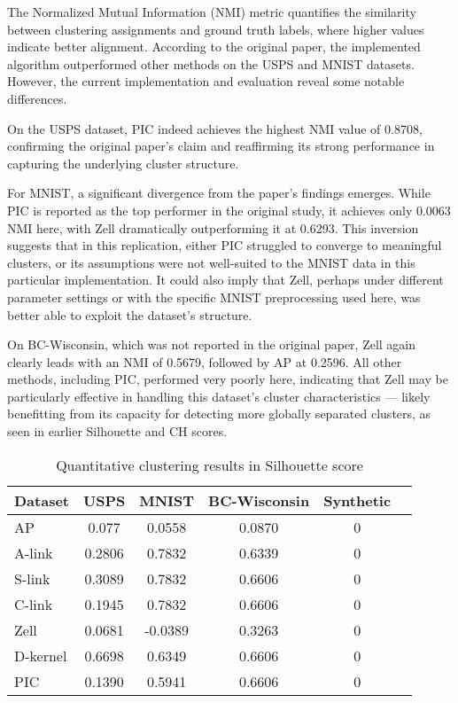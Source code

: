 \documentclass[
	10pt,
	parskip=half-,	
	paper=a4,
	english
	]{scrartcl}
\begin{document}
The Normalized Mutual Information (NMI) metric quantifies the similarity between clustering assignments and ground truth labels, where higher values indicate better alignment. According to the original paper, the implemented algorithm outperformed other methods on the USPS and MNIST datasets. However, the current implementation and evaluation reveal some notable differences.

On the USPS dataset, PIC indeed achieves the highest NMI value of 0.8708, confirming the original paper's claim and reaffirming its strong performance in capturing the underlying cluster structure. 

For MNIST, a significant divergence from the paper's findings emerges. While PIC is reported as the top performer in the original study, it achieves only 0.0063 NMI here, with Zell dramatically outperforming it at 0.6293. This inversion suggests that in this replication, either PIC struggled to converge to meaningful clusters, or its assumptions were not well-suited to the MNIST data in this particular implementation. It could also imply that Zell, perhaps under different parameter settings or with the specific MNIST preprocessing used here, was better able to exploit the dataset's structure.

On BC-Wisconsin, which was not reported in the original paper, Zell again clearly leads with an NMI of 0.5679, followed by AP at 0.2596. All other methods, including PIC, performed very poorly here, indicating that Zell may be particularly effective in handling this dataset's cluster characteristics — likely benefitting from its capacity for detecting more globally separated clusters, as seen in earlier Silhouette and CH scores.

\begin{table}[h]
    \centering
    \caption{Quantitative clustering results in Silhouette score}
    \begin{tabular}{lccccc}
    \toprule
    \textbf{Dataset} & \textbf{USPS} & \textbf{MNIST} & \textbf{BC-Wisconsin} & \textbf{Synthetic}\\
    \midrule
    AP       & 0.077   & 0.0558 & 0.0870  & 0 \\
    A-link   & 0.2806  & 0.7832 & 0.6339  & 0   \\
    S-link   & 0.3089   & 0.7832 & 0.6606  & 0 \\
    C-link   & 0.1945   & 0.7832 & 0.6606  & 0 \\
    Zell     & 0.0681   & -0.0389 & 0.3263  & 0 \\
    D-kernel & 0.6698   & 0.6349 & 0.6606  & 0 \\
    PIC      & 0.1390  & 0.5941 & 0.6606 & 0 \\
    \bottomrule
    \end{tabular}
\end{table}
\end{document}
